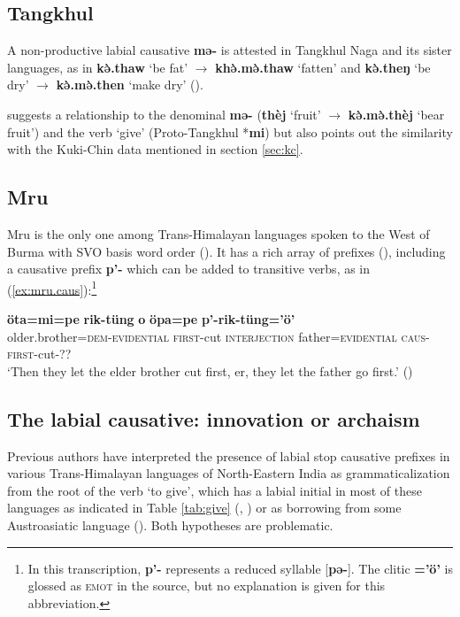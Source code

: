 \documentclass[oneside,a4paper,11pt]{article}
\newcommand{\ipa}[1]{\textbf{{\phon\mbox{#1}}}} %
\newcommand{\forme}[2]{\ipa{#1} `#2'}
\newcommand{\refb}[1]{(\ref{#1})}
\begin{document}
\subsection{Tangkhul} \label{sec:tangkhul}
A non-productive labial causative \ipa{mə-} is attested in Tangkhul Naga and its sister languages, as in \forme{kə̀.thaw}{be fat} $\rightarrow$ \forme{khə̀.mə̀.thaw}{fatten} and \forme{kə̀.theŋ}{be dry}  $\rightarrow$ \forme{kə̀.mə̀.then}{make dry}  (\citealt[23]{mortensen03tangkhul}). 

\citet[23]{mortensen03tangkhul} suggests a relationship to the denominal \ipa{mə-} (\forme{thèj}{fruit}  $\rightarrow$ \forme{kə̀.mə̀.thèj}{bear fruit}) and the verb `give' (Proto-Tangkhul *\ipa{mi}) but also points out the similarity with the Kuki-Chin data mentioned in section \ref{sec:kc}.

\subsection{Mru} \label{sec:mru}
Mru is the only one among Trans-Himalayan languages spoken to the West of Burma with SVO basis word order (\citealt{peterson05mru}). It has a rich array of prefixes (\citealt{williams08directionals}), including a causative prefix \ipa{p'-} which can be added to transitive verbs, as in \refb{ex:mru.caus}:\footnote{In this transcription, \ipa{p'-} represents a reduced syllable [\ipa{pə-}]. The clitic \ipa{=’ö’} is glossed as \textsc{emot} in the source, but no explanation is given for this abbreviation.}
 
\begin{exe}
\ex \label{ex:mru.caus}
\gll
\ipa{öta=mi=pe} \ipa{rik-tüng} \ipa{o} \ipa{öpa=pe} \ipa{p’-rik-tüng=’ö’} \\
older.brother=\textsc{dem-evidential} \textsc{first}-cut \textsc{interjection} father=\textsc{evidential} \textsc{caus-first}-cut-?? \\
\glt `Then they let the elder brother cut first, er, they let the father go first.' (\citealt[52]{williams08directionals})
\end{exe}
 
\subsection{The labial causative: innovation or archaism} \label{sec:innovation}
Previous authors have interpreted the presence of labial stop causative prefixes in various Trans-Himalayan languages of North-Eastern India as  grammaticalization from the root of the verb `to give', which has a labial initial in most of these languages as indicated in Table \ref{tab:give}
(\citealt[132]{matisoff03}, \citealt{jenny15give}) or as borrowing from some Austroasiatic language (\citealt{maspero46, diffloth08parallels, konnerth15cisloc, delancey15adjectival}). Both hypotheses are problematic. 
\end{document}
